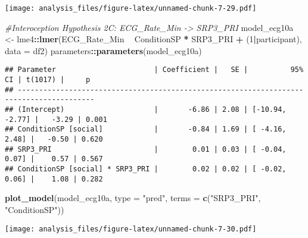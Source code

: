 \documentclass[
]{article}
\newenvironment{Shaded}{\begin{snugshade}}{\end{snugshade}}
\newcommand{\CommentTok}[1]{\textcolor[rgb]{0.56,0.35,0.01}{\textit{#1}}}
\newcommand{\DataTypeTok}[1]{\textcolor[rgb]{0.13,0.29,0.53}{#1}}
\newcommand{\DecValTok}[1]{\textcolor[rgb]{0.00,0.00,0.81}{#1}}
\newcommand{\KeywordTok}[1]{\textcolor[rgb]{0.13,0.29,0.53}{\textbf{#1}}}
\newcommand{\NormalTok}[1]{#1}
\newcommand{\OperatorTok}[1]{\textcolor[rgb]{0.81,0.36,0.00}{\textbf{#1}}}
\newcommand{\StringTok}[1]{\textcolor[rgb]{0.31,0.60,0.02}{#1}}
\begin{document}
\texttt{[image: analysis\_files/figure-latex/unnamed-chunk-7-29.pdf]}

\begin{Shaded}
\begin{Highlighting}[]
\CommentTok{#Interoception Hypothesis 2C: ECG_Rate_Min -> SRP3_PRI}
\NormalTok{model_ecg10a <-}\StringTok{ }\NormalTok{lme4}\OperatorTok{::}\KeywordTok{lmer}\NormalTok{(ECG_Rate_Min }\OperatorTok{~}\StringTok{ }\NormalTok{ConditionSP }\OperatorTok{*}\StringTok{ }\NormalTok{SRP3_PRI }\OperatorTok{+}\StringTok{ }\NormalTok{(}\DecValTok{1}\OperatorTok{|}\NormalTok{participant), }\DataTypeTok{data =}\NormalTok{ df2)}
\NormalTok{parameters}\OperatorTok{::}\KeywordTok{parameters}\NormalTok{(model_ecg10a)}
\end{Highlighting}
\end{Shaded}

\begin{verbatim}
## Parameter                       | Coefficient |   SE |          95% CI | t(1017) |     p
## ----------------------------------------------------------------------------------------
## (Intercept)                     |       -6.86 | 2.08 | [-10.94, -2.77] |   -3.29 | 0.001
## ConditionSP [social]            |       -0.84 | 1.69 | [ -4.16,  2.48] |   -0.50 | 0.620
## SRP3_PRI                        |        0.01 | 0.03 | [ -0.04,  0.07] |    0.57 | 0.567
## ConditionSP [social] * SRP3_PRI |        0.02 | 0.02 | [ -0.02,  0.06] |    1.08 | 0.282
\end{verbatim}

\begin{Shaded}
\begin{Highlighting}[]
\KeywordTok{plot_model}\NormalTok{(model_ecg10a, }\DataTypeTok{type =} \StringTok{"pred"}\NormalTok{, }\DataTypeTok{terms =} \KeywordTok{c}\NormalTok{(}\StringTok{"SRP3_PRI"}\NormalTok{, }\StringTok{"ConditionSP"}\NormalTok{))}
\end{Highlighting}
\end{Shaded}

\texttt{[image: analysis\_files/figure-latex/unnamed-chunk-7-30.pdf]}
\end{document}

